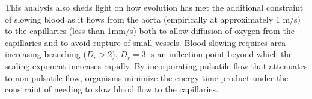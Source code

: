 \documentclass[12pt]{article}
\begin{document}
This analysis also sheds light on how evolution has met the additional constraint of slowing blood as it flows from the aorta (empirically at approximately 1 m/s) to the capillaries (less than 1mm/s) both to allow diffusion of oxygen from the capillaries and to avoid rupture of small vessels. Blood slowing requires area increasing branching ($D_r > 2$).  $D_r = 3$ is an inflection point beyond which the scaling exponent increases rapidly. By incorporating pulsatile flow that attenuates to non-pulsatile flow, organisms minimize the energy time product under the constraint of needing to slow blood flow to the capillaries.


%

  


\end{document}
